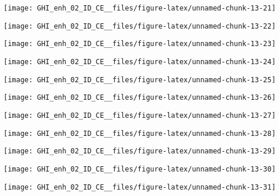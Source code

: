 \documentclass[
  10pt,
  a4paper,oneside]{article}
\begin{document}
\begin{center}\texttt{[image: GHI\_enh\_02\_ID\_CE\_\_files/figure-latex/unnamed-chunk-13-21]} \end{center}

\begin{center}\texttt{[image: GHI\_enh\_02\_ID\_CE\_\_files/figure-latex/unnamed-chunk-13-22]} \end{center}

\begin{center}\texttt{[image: GHI\_enh\_02\_ID\_CE\_\_files/figure-latex/unnamed-chunk-13-23]} \end{center}

\begin{center}\texttt{[image: GHI\_enh\_02\_ID\_CE\_\_files/figure-latex/unnamed-chunk-13-24]} \end{center}

\begin{center}\texttt{[image: GHI\_enh\_02\_ID\_CE\_\_files/figure-latex/unnamed-chunk-13-25]} \end{center}

\begin{center}\texttt{[image: GHI\_enh\_02\_ID\_CE\_\_files/figure-latex/unnamed-chunk-13-26]} \end{center}

\begin{center}\texttt{[image: GHI\_enh\_02\_ID\_CE\_\_files/figure-latex/unnamed-chunk-13-27]} \end{center}

\begin{center}\texttt{[image: GHI\_enh\_02\_ID\_CE\_\_files/figure-latex/unnamed-chunk-13-28]} \end{center}

\begin{center}\texttt{[image: GHI\_enh\_02\_ID\_CE\_\_files/figure-latex/unnamed-chunk-13-29]} \end{center}

\begin{center}\texttt{[image: GHI\_enh\_02\_ID\_CE\_\_files/figure-latex/unnamed-chunk-13-30]} \end{center}

\begin{center}\texttt{[image: GHI\_enh\_02\_ID\_CE\_\_files/figure-latex/unnamed-chunk-13-31]} \end{center}
\end{document}
